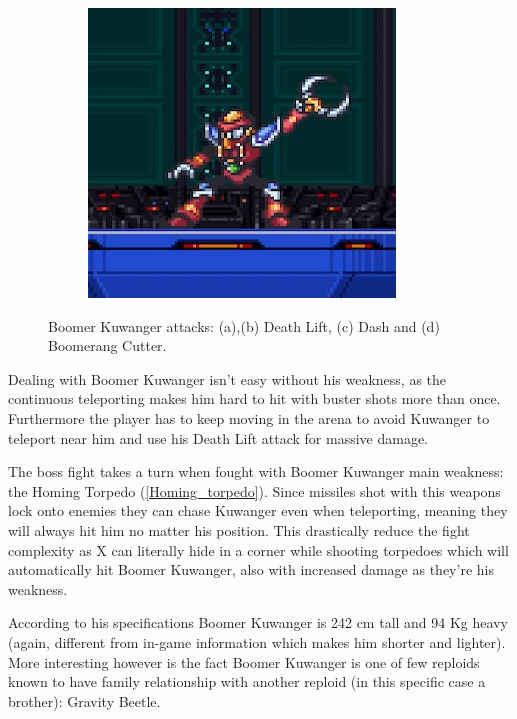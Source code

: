 \begin{figure}[htp]
\begin{subfigure}{0.4\linewidth}
		\caption{}
	\end{subfigure}
	\begin{subfigure}{0.4\linewidth}
		\centering
		\includegraphics[width=\linewidth]{figures/X1/Boomer_throw.jpg}
		\caption{}
	\end{subfigure}
	\caption{Boomer Kuwanger attacks: (a),(b) Death Lift, (c) Dash and (d) Boomerang Cutter.}
\end{figure}
Dealing with Boomer Kuwanger isn't easy without his weakness, as the continuous teleporting makes him hard to hit with buster shots more than once. Furthermore the player has to keep moving in the arena to avoid Kuwanger to teleport near him and use his Death Lift attack for massive damage.

The boss fight takes a turn when fought with Boomer Kuwanger main weakness: the Homing Torpedo (\ref{Homing_torpedo}). Since missiles shot with this weapons lock onto enemies they can chase Kuwanger even when teleporting, meaning they will always hit him no matter his position. This drastically reduce the fight complexity as X can literally hide in a corner while shooting torpedoes which will automatically hit Boomer Kuwanger, also with increased damage as they're his weakness.

According to his specifications Boomer Kuwanger is 242 cm tall and 94 Kg heavy (again, different from in-game information which makes him shorter and lighter). More interesting however is the fact Boomer Kuwanger is one of few reploids known to have family relationship with another reploid (in this specific case a brother): Gravity Beetle.%

